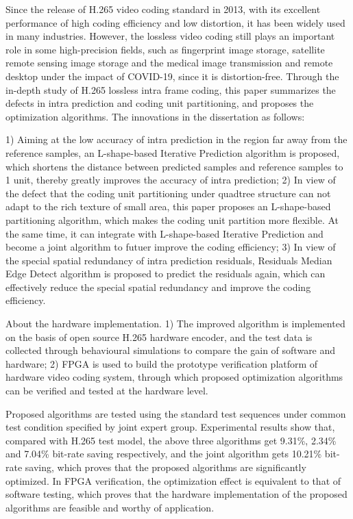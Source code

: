 \begin{eabstract}
    Since the release of H.265 video coding standard in 2013, with its excellent performance of high coding efficiency and low distortion, it has been widely used in many industries. However, the lossless video coding still plays an important role in some high-precision fields, such as fingerprint image storage, satellite remote sensing image storage and the medical image transmission and remote desktop under the impact of COVID-19, since it is distortion-free. Through the in-depth study of H.265 lossless intra frame coding, this paper summarizes the defects in intra prediction and coding unit partitioning, and proposes the optimization algorithms. The innovations in the dissertation as follows:

    1) Aiming at the low accuracy of intra prediction in the region far away from the reference samples, an L-shape-based Iterative Prediction algorithm is proposed, which shortens the distance between predicted samples and reference samples to 1 unit, thereby greatly improves the accuracy of intra prediction; 2) In view of the defect that the coding unit partitioning under quadtree structure can not adapt to the rich texture of small area, this paper proposes an L-shape-based partitioning algorithm, which makes the coding unit partition more flexible. At the same time, it can integrate with L-shape-based Iterative Prediction and become a joint algorithm to futuer improve the coding efficiency; 3) In view of the special spatial redundancy of intra prediction residuals, Residuals Median Edge Detect algorithm is proposed to predict the residuals again, which can effectively reduce the special spatial redundancy and improve the coding efficiency.

    About the hardware implementation. 1) The improved algorithm is implemented on the basis of open source H.265 hardware encoder, and the test data is collected through behavioural simulations to compare the gain of software and hardware; 2) FPGA is used to build the prototype verification platform of hardware video coding system, through which proposed optimization algorithms can be verified and tested at the hardware level.

    Proposed algorithms are tested using the standard test sequences under common test condition specified by joint expert group. Experimental results show that, compared with H.265 test model, the above three algorithms get 9.31\%, 2.34\% and 7.04\% bit-rate saving respectively, and the joint algorithm gets 10.21\% bit-rate saving, which proves that the proposed algorithms are significantly optimized. In FPGA verification, the optimization effect is equivalent to that of software testing, which proves that the hardware implementation of the proposed algorithms are feasible and worthy of application.

\end{eabstract}

